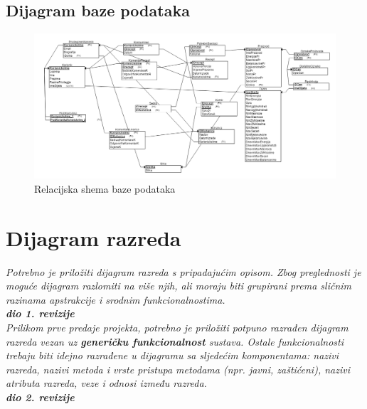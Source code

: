 \subsection{Dijagram baze podataka}
			\begin{figure}[H]
					\centering
					\includegraphics[scale=0.4]{slike/REL-model-baze.png}
					\caption{Relacijska shema baze podataka}
					\label{fig:REL-model-baze}
				\end{figure} 
			\eject
			
			
		\section{Dijagram razreda}
		
			\textit{Potrebno je priložiti dijagram razreda s pripadajućim opisom. Zbog preglednosti je moguće dijagram razlomiti na više njih, ali moraju biti grupirani prema sličnim razinama apstrakcije i srodnim funkcionalnostima.}\\
			
			\textbf{\textit{dio 1. revizije}}\\
			
			\textit{Prilikom prve predaje projekta, potrebno je priložiti potpuno razrađen dijagram razreda vezan uz \textbf{generičku funkcionalnost} sustava. Ostale funkcionalnosti trebaju biti idejno razrađene u dijagramu sa sljedećim komponentama: nazivi razreda, nazivi metoda i vrste pristupa metodama (npr. javni, zaštićeni), nazivi atributa razreda, veze i odnosi između razreda.}\\
			
			\textbf{\textit{dio 2. revizije}}\\			
			
